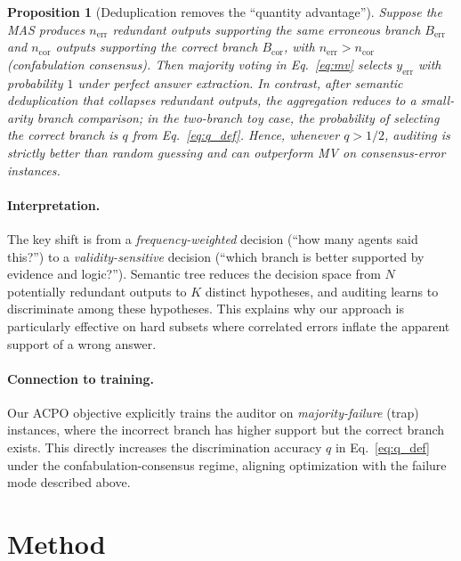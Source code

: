 \documentclass{article}
\theoremstyle{plain}
\newtheorem{proposition}[theorem]{Proposition}
\theoremstyle{definition}
\theoremstyle{remark}
\begin{document}
\begin{proposition}[Deduplication removes the ``quantity advantage'']
\label{prop:dedup_pairwise}
Suppose the MAS produces $n_{\mathrm{err}}$ redundant outputs supporting the same erroneous branch $B_{\mathrm{err}}$ and
$n_{\mathrm{cor}}$ outputs supporting the correct branch $B_{\mathrm{cor}}$, with $n_{\mathrm{err}} > n_{\mathrm{cor}}$ (confabulation consensus).
Then majority voting in Eq.~\eqref{eq:mv} selects $y_{\mathrm{err}}$ with probability $1$ under perfect answer extraction.
In contrast, after semantic deduplication that collapses redundant outputs, the aggregation reduces to a small-arity branch comparison; in the
two-branch toy case, the probability of selecting the correct branch is $q$ from Eq.~\eqref{eq:q_def}.
Hence, whenever $q>1/2$, auditing is strictly better than random guessing and can outperform MV on consensus-error instances.
\end{proposition}

\paragraph{Interpretation.}
The key shift is from a \emph{frequency-weighted} decision (``how many agents said this?'') to a \emph{validity-sensitive} decision
(``which branch is better supported by evidence and logic?'').
Semantic tree reduces the decision space from $N$ potentially redundant outputs to $K$ distinct hypotheses, and auditing learns to
discriminate among these hypotheses. This explains why our approach is particularly effective on hard subsets where correlated errors
inflate the apparent support of a wrong answer.

\paragraph{Connection to training.}
Our ACPO objective explicitly trains the auditor on \emph{majority-failure} (trap) instances, where the incorrect branch has higher support
but the correct branch exists. This directly increases the discrimination accuracy $q$ in Eq.~\eqref{eq:q_def} under the confabulation-consensus regime,
aligning optimization with the failure mode described above.





\section{Method}
\end{document}
